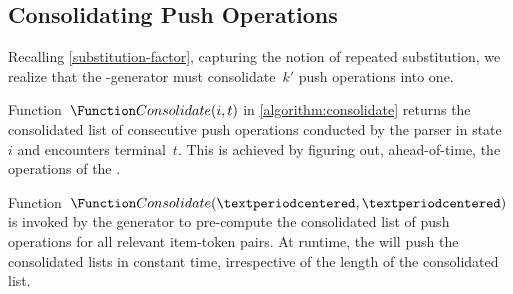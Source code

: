 \subsection{Consolidating Push Operations }
Recalling \cref{substitution-factor}, capturing the notion of
repeated substitution, we realize that the \RLLp-generator
must consolidate~$k'$ push operations into one.

Function~$\Function Consolidate(i,t)$ in \cref{algorithm:consolidate}
returns the consolidated list of consecutive push operations conducted
by the \RLLp parser in state~$i$ and encounters terminal~$t$.
This is achieved by figuring out, ahead-of-time,
the operations of the \LLp.

Function~$\Function Consolidate(·,·)$ is invoked by the \RLLp generator
to pre-compute the consolidated list of push operations for all relevant
item-token pairs.
At runtime, the \RLLp will push the consolidated lists in constant time,
irrespective of the length of the consolidated list.

